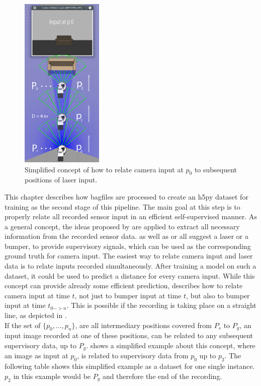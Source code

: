 \begin{figure}
\centering
\includegraphics[width=0.35\textwidth]{Bilder/FeatureExtraction_5.png}
\captionsetup{width=0.35\textwidth}
\caption{Simplified concept of how to relate camera input at $p_{0}$ to subsequent positions of laser input.}
\label{featureExtraction5}
\end{figure}

This chapter describes how bagfiles are processed to create an h5py dataset for training as the second stage of this pipeline. The main goal at this step is to properly relate all recorded sensor input in an efficient self-supervised manner. As a general concept, the ideas proposed by \cite{nava2019learning} are applied to extract all necessary information from the recorded sensor data. \cite{nava2019learning} as well as \cite{5979661} or \cite{Dahlkamp-RSS-06} all suggest a laser or a bumper, to provide supervisory signals, which can be used as the corresponding ground truth for camera input. The easiest way to relate camera input and laser data is to relate inputs recorded simultaneously. After training a model on such a dataset, it could be used to predict a distance for every camera input. While this concept can provide already some efficient prediction, \cite{nava2019learning} describes how to relate camera input at time $t$, not just to bumper input at time $t$, but also to bumper input at time $t_{0 -> n}$. This is possible if the recording is taking place on a straight line, as depicted in .\\

If the set of $\{p_{0},...,p_{n}\}$, are all intermediary positions covered from $P_{s}$ to $P_{g}$, an input image recorded at one of these positions, can be related to any subsequent supervisory data, up to $P_{g}$.  shows a simplified example about this concept, where an image as input at $p_{0}$, is related to supervisory data from $p_{0}$ up to $p_{2}$. The following table shows this simplified example as a dataset for one single instance. $p_{2}$ in this example would be $P_{g}$ and therefore the end of the recording. \\

